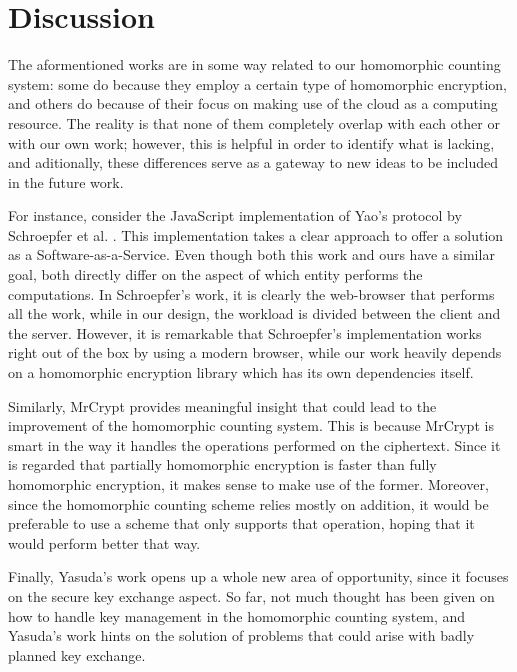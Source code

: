 \section{Discussion}

The aformentioned works are in some way related to our homomorphic counting system: some do because they employ a certain type of homomorphic encryption, and others do because of their focus on making use of the cloud as a computing resource. The reality is that none of them completely overlap with each other or with our own work; however, this is helpful in order to identify what is lacking, and aditionally, these differences serve as a gateway to new ideas to be included in the future work.

For instance, consider the JavaScript implementation of Yao's protocol \cite{Yao:1986:GES:1382439.1382944} by Schroepfer et al. \cite{Schroepfer:2011:DSC:2046707.2093509}. This implementation takes a clear approach to offer a solution as a Software-as-a-Service. Even though both this work and ours have a similar goal, both directly differ on the aspect of which entity performs the computations. In Schroepfer's work, it is clearly the web-browser that performs all the work, while in our design, the workload is divided between the client and the server. However, it is remarkable that Schroepfer's implementation works right out of the box by using a modern browser, while our work heavily depends on a homomorphic encryption library which has its own dependencies itself.

Similarly, MrCrypt \cite{Tetali:2013:MSA:2544173.2509554} provides meaningful insight that could lead to the improvement of the homomorphic counting system. This is because MrCrypt is smart in the way it handles the operations performed on the ciphertext. Since it is regarded that partially homomorphic encryption is faster than fully homomorphic encryption, it makes sense to make use of the former. Moreover, since the homomorphic counting scheme relies mostly on addition, it would be preferable to use a scheme that only supports that operation, hoping that it would perform better that way.

Finally, Yasuda's \cite{Yasuda:2015:SDD:2732516.2732521} work opens up a whole new area of opportunity, since it focuses on the secure key exchange aspect. So far, not much thought has been given on how to handle key management in the homomorphic counting system, and Yasuda's work hints on the solution of problems that could arise with badly planned key exchange.

